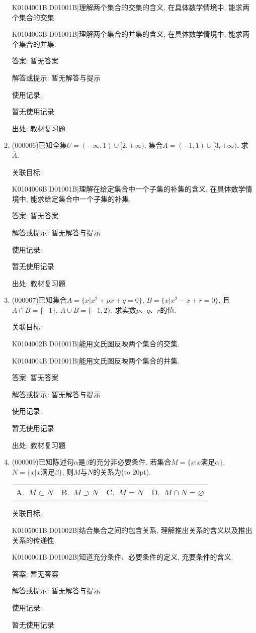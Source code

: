 \documentclass[10pt,a4paper]{article}
\newcommand{\bracket}[1]{(\hbox to #1pt{})}
\newcommand{\fourch}[4]{\par\begin{tabular}{p{.23\textwidth}p{.23\textwidth}p{.23\textwidth}p{.23\textwidth}}
A.~#1 &B.~#2& C.~#3& D.~#4
\end{tabular}}
\begin{document}
\begin{enumerate}[1.]
K0104001B|D01001B|理解两个集合的交集的含义, 在具体数学情境中, 能求两个集合的交集.

K0104003B|D01001B|理解两个集合的并集的含义, 在具体数学情境中, 能求两个集合的并集.

答案: 暂无答案

解答或提示: 暂无解答与提示

使用记录:

暂无使用记录


出处: 教材复习题
\item { (000006)}已知全集$U=(-\infty, 1)\cup [2, +\infty)$, 集合$A=(-1, 1)\cup [3, +\infty)$. 求$\overline{A}$.


关联目标:

K0104006B|D01001B|理解在给定集合中一个子集的补集的含义, 在具体数学情境中, 能求给定集合中一个子集的补集.

答案: 暂无答案

解答或提示: 暂无解答与提示

使用记录:

暂无使用记录


出处: 教材复习题
\item { (000007)}已知集合$A=\{x|x^2+px+q=0\}$, $B=\{x|x^2-x+r=0\}$, 且$A\cap B=\{-1\}$, $A\cup B=\{-1, 2\}$. 求实数$p$、$q$、$r$的值.


关联目标:

K0104002B|D01001B|能用文氏图反映两个集合的交集.

K0104004B|D01001B|能用文氏图反映两个集合的并集.

答案: 暂无答案

解答或提示: 暂无解答与提示

使用记录:

暂无使用记录


出处: 教材复习题
\item { (000009)}已知陈述句$\alpha$是$\beta$的充分非必要条件. 若集合$M=\{x|x\text{满足}\alpha\}$, $N=\{x|x\text{满足}\beta\}$, 则$M$与$N$的关系为\bracket{20}.
\fourch{$M\subset N$}{$M\supset N$}{$M=N$}{$M\cap N=\varnothing$}


关联目标:

K0105001B|D01002B|结合集合之间的包含关系, 理解推出关系的含义以及推出关系的传递性.

K0106001B|D01002B|知道充分条件、必要条件的定义, 充要条件的含义.

答案: 暂无答案

解答或提示: 暂无解答与提示

使用记录:

暂无使用记录



\end{enumerate}
\end{document}
